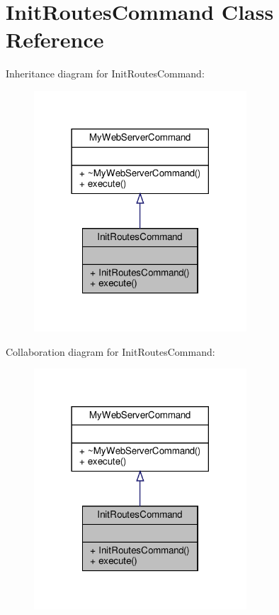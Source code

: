 \hypertarget{classInitRoutesCommand}{}\section{Init\+Routes\+Command Class Reference}
\label{classInitRoutesCommand}


Inheritance diagram for Init\+Routes\+Command\+:\nopagebreak
\begin{figure}[H]
\begin{center}
\leavevmode
\includegraphics[width=225pt]{classInitRoutesCommand__inherit__graph}
\end{center}
\end{figure}


Collaboration diagram for Init\+Routes\+Command\+:\nopagebreak
\begin{figure}[H]
\begin{center}
\leavevmode
\includegraphics[width=225pt]{classInitRoutesCommand__coll__graph}
\end{center}
\end{figure}
